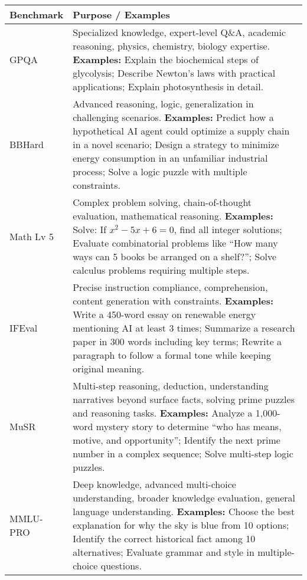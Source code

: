 \begin{tabularx}{\textwidth}{|>{\hsize=0.15\hsize}X|>{\hsize=0.85\hsize}X|}
\hline
\textbf{Benchmark} & \textbf{Purpose / Examples} \\
\hline
GPQA & Specialized knowledge, expert-level Q\&A, academic reasoning, physics, chemistry, biology expertise.  \newline
\textbf{Examples:} Explain the biochemical steps of glycolysis; Describe Newton’s laws with practical applications; Explain photosynthesis in detail. \\
\hline
BBHard & Advanced reasoning, logic, generalization in challenging scenarios.  \newline
\textbf{Examples:} Predict how a hypothetical AI agent could optimize a supply chain in a novel scenario; Design a strategy to minimize energy consumption in an unfamiliar industrial process; Solve a logic puzzle with multiple constraints. \\
\hline
Math Lv 5 & Complex problem solving, chain-of-thought evaluation, mathematical reasoning.  \newline
\textbf{Examples:} Solve: If \(x^2 - 5x + 6 = 0\), find all integer solutions; Evaluate combinatorial problems like “How many ways can 5 books be arranged on a shelf?”; Solve calculus problems requiring multiple steps. \\
\hline
IFEval & Precise instruction compliance, comprehension, content generation with constraints.  \newline
\textbf{Examples:} Write a 450-word essay on renewable energy mentioning AI at least 3 times; Summarize a research paper in 300 words including key terms; Rewrite a paragraph to follow a formal tone while keeping original meaning. \\
\hline
MuSR & Multi-step reasoning, deduction, understanding narratives beyond surface facts, solving prime puzzles and reasoning tasks.  \newline
\textbf{Examples:} Analyze a 1,000-word mystery story to determine “who has means, motive, and opportunity”; Identify the next prime number in a complex sequence; Solve multi-step logic puzzles. \\
\hline
MMLU-PRO & Deep knowledge, advanced multi-choice understanding, broader knowledge evaluation, general language understanding.  \newline
\textbf{Examples:} Choose the best explanation for why the sky is blue from 10 options; Identify the correct historical fact among 10 alternatives; Evaluate grammar and style in multiple-choice questions. \\
\hline
\end{tabularx}

